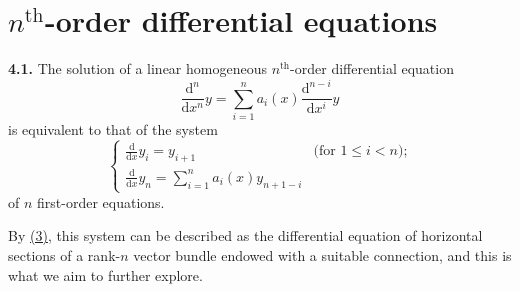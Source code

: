 \documentclass{report}
\newenvironment{rmenv}[1]
  {\phantomsection\par\medskip\noindent\textbf{#1.}\rmfamily}
  {\par\medskip}
\newcommand{\dd}{\mathrm{d}}
\renewcommand{\leq}{\leqslant}
\begin{document}
\section{\texorpdfstring{$n^\mathrm{th}$}{nth}-order differential equations}
\label{I.4}

\begin{rmenv}{4.1}
\label{I.4.1}
  The solution of a linear homogeneous $n^\mathrm{th}$-order differential equation
  \[
  \label{I.4.1.1}
    \frac{\dd^n}{\dd x^n}y = \sum_{i=1}^n a_i(x) \frac{\dd^{n-i}}{\dd x^i}y
  \tag{4.1.1}
  \]
  is equivalent to that of the system
  \[
  \label{I.4.1.2}
    \begin{cases}
      \frac{\dd}{\dd x}y_i
      = y_{i+1} &\mbox{(for $1\leq i<n$);}
    \\\frac{\dd}{\dd x}y_n
      = \sum_{i=1}^n a_i(x) y_{n+1-i}
    \end{cases}
  \tag{4.1.2}
  \]
  of $n$ first-order equations.

  By \hyperref[I.3]{(3)}, this system can be described as the differential equation of horizontal sections of a rank-$n$ vector bundle endowed with a suitable connection, and this is what we aim to further explore.
\end{rmenv}
\end{document}
